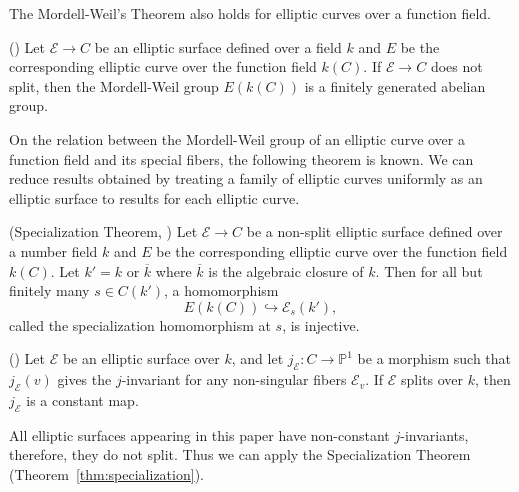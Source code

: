 \documentclass[main]{subfiles}
\begin{document}
The Mordell-Weil's Theorem also holds for elliptic curves over a function field.
\begin{thm}{(\cite[Theorem III.6.1.]{ref:advancedaec})}
    \label{thm:mordell_function_field}
    Let $\mathcal{E} \to C$ be an elliptic surface defined over a field $k$ and $E$ be the corresponding elliptic curve over the function field $k(C)$.
    If $\mathcal{E} \to C$ does not split, then the Mordell-Weil group $E(k(C))$ is a finitely generated abelian group.
\end{thm}

On the relation between the Mordell-Weil group of an elliptic curve over a function field and its special fibers, the following theorem is known.
We can reduce results obtained by treating a family of elliptic curves uniformly as an elliptic surface to results for each elliptic curve.
\begin{thm}{(Specialization Theorem, \cite[Theorem III.11.4.]{ref:advancedaec})}
    \label{thm:specialization}
    Let $\mathcal{E} \to C$ be a non-split elliptic surface defined over a number field $k$ and $E$ be the corresponding elliptic curve over the function field $k(C)$.
    Let $k'=k$ or $\overline{k}$ where $\overline{k}$ is the algebraic closure of $k$.
    Then for all but finitely many $s \in C(k')$, a homomorphism
    \begin{equation*}
        E(k(C)) \hookrightarrow \mathcal{E}_{s}(k'),
    \end{equation*}
    called the specialization homomorphism at $s$, is injective.
\end{thm}

\begin{lem}{(\cite[Exercise 3.9.(a)]{ref:advancedaec})}
    Let $\mathcal{E}$ be an elliptic surface over $k$, and let $j_{\mathcal{E}}: C \to \mathbb{P}^1$ be a morphism such that $j_{\mathcal{E}}(v)$ gives the $j$-invariant for any non-singular fibers $\mathcal{E}_v$.
    If $\mathcal{E}$ splits over $k$, then $j_{\mathcal{E}}$ is a constant map.
\end{lem}

\begin{rem}
    All elliptic surfaces appearing in this paper have non-constant $j$-invariants, therefore, they do not split.
    Thus we can apply the Specialization Theorem (Theorem~\ref{thm:specialization}).
\end{rem}
\end{document}
